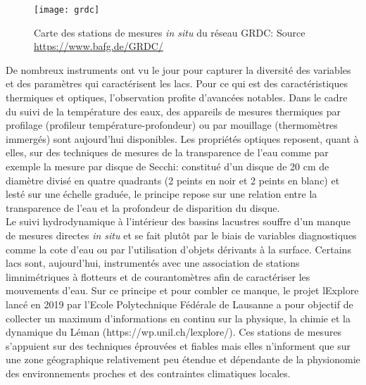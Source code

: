 \begin{figure}[h!]
 \centerline{\texttt{[image: grdc]}}
 \caption{Carte des stations de mesures \textit{in situ} du réseau GRDC: Source \url{https://www.bafg.de/GRDC/}}
 \label{grdc}
\end{figure}

De nombreux instruments ont vu le jour pour capturer la diversité des variables et des paramètres qui caractérisent les lacs. Pour ce qui est des caractéristiques thermiques et optiques, l'observation profite d'avancées notables. Dans le cadre du suivi de la température des eaux, des appareils de mesures thermiques par profilage (profileur température-profondeur) ou par mouillage (thermomètres immergés) sont aujourd'hui disponibles. Les propriétés optiques reposent, quant à elles, sur des techniques de mesures de la transparence de l'eau comme par exemple la mesure par disque de Secchi: constitué d'un disque de 20 cm de diamètre divisé en quatre quadrants (2 peints en noir et 2 peints en blanc) et lesté sur une échelle graduée, le principe repose sur une relation entre la transparence de l'eau et la profondeur de disparition du disque. \\

Le suivi hydrodynamique à l'intérieur des bassins lacustres souffre d'un manque de mesures directes \textit{in situ} et se fait plutôt par le biais de variables diagnostiques comme la cote d'eau ou par l'utilisation d'objets dérivants à la surface. Certains lacs sont, aujourd'hui, instrumentés avec une association de stations limnimétriques à flotteurs et de courantomètres afin de caractériser les mouvements d'eau. Sur ce principe et pour combler ce manque, le projet lExplore lancé en 2019 par l'Ecole Polytechnique Fédérale de Lausanne a pour objectif de collecter un maximum d'informations en continu sur la physique, la chimie et la dynamique du Léman (https://wp.unil.ch/lexplore/).
Ces stations de mesures s'appuient sur des techniques éprouvées et fiables mais elles n'informent que sur une zone géographique relativement peu étendue et dépendante de la physionomie des environnements proches et des contraintes climatiques locales. \\

